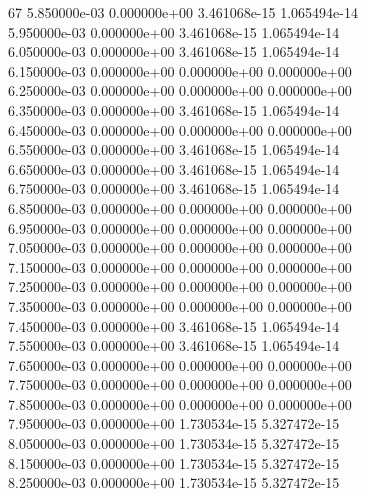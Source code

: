 67	5.850000e-03	0.000000e+00	3.461068e-15	1.065494e-14	\\ 	5.950000e-03	0.000000e+00	3.461068e-15	1.065494e-14	\\ 	6.050000e-03	0.000000e+00	3.461068e-15	1.065494e-14	\\ 	6.150000e-03	0.000000e+00	0.000000e+00	0.000000e+00	\\ 	6.250000e-03	0.000000e+00	0.000000e+00	0.000000e+00	\\ 	6.350000e-03	0.000000e+00	3.461068e-15	1.065494e-14	\\ 	6.450000e-03	0.000000e+00	0.000000e+00	0.000000e+00	\\ 	6.550000e-03	0.000000e+00	3.461068e-15	1.065494e-14	\\ 	6.650000e-03	0.000000e+00	3.461068e-15	1.065494e-14	\\ 	6.750000e-03	0.000000e+00	3.461068e-15	1.065494e-14	\\ 	6.850000e-03	0.000000e+00	0.000000e+00	0.000000e+00	\\ 	6.950000e-03	0.000000e+00	0.000000e+00	0.000000e+00	\\ 	7.050000e-03	0.000000e+00	0.000000e+00	0.000000e+00	\\ 	7.150000e-03	0.000000e+00	0.000000e+00	0.000000e+00	\\ 	7.250000e-03	0.000000e+00	0.000000e+00	0.000000e+00	\\ 	7.350000e-03	0.000000e+00	0.000000e+00	0.000000e+00	\\ 	7.450000e-03	0.000000e+00	3.461068e-15	1.065494e-14	\\ 	7.550000e-03	0.000000e+00	3.461068e-15	1.065494e-14	\\ 	7.650000e-03	0.000000e+00	0.000000e+00	0.000000e+00	\\ 	7.750000e-03	0.000000e+00	0.000000e+00	0.000000e+00	\\ 	7.850000e-03	0.000000e+00	0.000000e+00	0.000000e+00	\\ 	7.950000e-03	0.000000e+00	1.730534e-15	5.327472e-15	\\ 	8.050000e-03	0.000000e+00	1.730534e-15	5.327472e-15	\\ 	8.150000e-03	0.000000e+00	1.730534e-15	5.327472e-15	\\ 	8.250000e-03	0.000000e+00	1.730534e-15	5.327472e-15	\\ \hline
